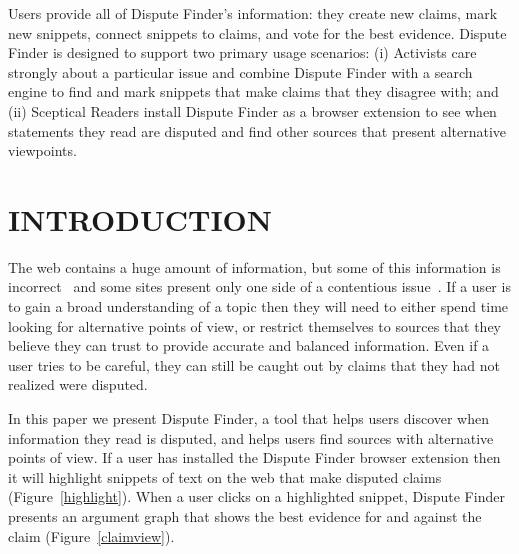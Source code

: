 \documentclass{www2010-submission}
\newcommand{\todo}[1]{}
\begin{document}
Users provide all of Dispute Finder's information: they create new claims, mark new snippets, connect snippets to claims, and vote for the best evidence.
Dispute Finder is designed to support two primary usage scenarios: (i) Activists care strongly about a particular issue and combine Dispute Finder with a search engine to find and mark snippets that make claims that they disagree with; and (ii) Sceptical Readers install Dispute Finder as a browser extension to see when statements they read are disputed and find other sources that present alternative viewpoints.







\section{INTRODUCTION}

\todo{update screenshots}

The web contains a huge amount of information, but some of this information is incorrect~\cite{Neumann2003,Resnik1998,Zhou2004} and some sites present only one side of a contentious issue~\cite{Herman2002}. 
If a user is to gain a broad understanding of a topic then they will need to either spend time looking for alternative points of view, or restrict themselves to sources that they believe they can trust to provide accurate and balanced information.
Even if a user tries to be careful, they can still be caught out by claims that they had not realized were disputed.
\todo{word this better}\todo{update all screenshots}

In this paper we present Dispute Finder, a tool that helps users discover when information they read is disputed, and helps users find sources with alternative points of view. 
If a user has installed the Dispute Finder browser extension then it will highlight snippets of text on the web that make disputed claims (Figure~\ref{highlight}). 
When a user clicks on a highlighted snippet, Dispute Finder presents an argument graph that shows the best evidence for and against the claim (Figure~\ref{claimview}). 
\end{document}

